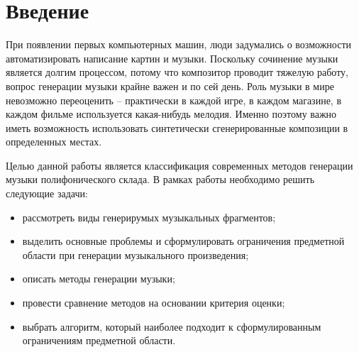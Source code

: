 \chapter*{Введение}

При появлении первых компьютерных машин, люди задумались о возможности автоматизировать написание картин и музыки. Поскольку сочинение музыки является долгим процессом, потому что композитор проводит тяжелую работу, вопрос генерации музыки крайне важен и по сей день. Роль музыки в мире невозможно переоценить -- практически в каждой игре, в каждом магазине, в каждом фильме используется какая-нибудь мелодия. Именно поэтому важно иметь возможность использовать синтетически сгенерированные композиции в определенных местах.

Целью данной работы является классификация современных методов генерации музыки полифонического склада. В рамках работы необходимо решить следующие задачи:

\begin{itemize}
    \item рассмотреть виды генерирумых музыкальных фрагментов;
    \item выделить основные проблемы и сформулировать ограничения предметной области при генерации музыкального произведения;
    \item описать методы генерации музыки;
    \item провести сравнение методов на основании критерия оценки;
    \item выбрать алгоритм, который наиболее подходит к сформулированным ограничениям предметной области.
\end{itemize}














